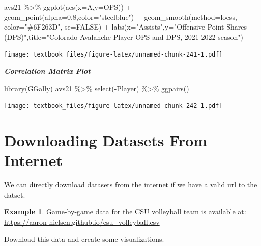 \documentclass[
  11pt,
]{book}
\newenvironment{Shaded}{\begin{snugshade}}{\end{snugshade}}
\newcommand{\AttributeTok}[1]{\textcolor[rgb]{0.77,0.63,0.00}{#1}}
\newcommand{\ConstantTok}[1]{\textcolor[rgb]{0.00,0.00,0.00}{#1}}
\newcommand{\FloatTok}[1]{\textcolor[rgb]{0.00,0.00,0.81}{#1}}
\newcommand{\FunctionTok}[1]{\textcolor[rgb]{0.00,0.00,0.00}{#1}}
\newcommand{\NormalTok}[1]{#1}
\newcommand{\SpecialCharTok}[1]{\textcolor[rgb]{0.00,0.00,0.00}{#1}}
\newcommand{\StringTok}[1]{\textcolor[rgb]{0.31,0.60,0.02}{#1}}
\theoremstyle{definition}
\theoremstyle{definition}
\newtheorem{example}{Example}[chapter]
\theoremstyle{definition}
\theoremstyle{definition}
\theoremstyle{remark}
\begin{document}
\begin{Shaded}
\begin{Highlighting}[]
\NormalTok{avs21 }\SpecialCharTok{\%\textgreater{}\%} \FunctionTok{ggplot}\NormalTok{(}\FunctionTok{aes}\NormalTok{(}\AttributeTok{x=}\NormalTok{A,}\AttributeTok{y=}\NormalTok{OPS)) }\SpecialCharTok{+} \FunctionTok{geom\_point}\NormalTok{(}\AttributeTok{alpha=}\FloatTok{0.8}\NormalTok{,}\AttributeTok{color=}\StringTok{"steelblue"}\NormalTok{) }\SpecialCharTok{+}
  \FunctionTok{geom\_smooth}\NormalTok{(}\AttributeTok{method=}\NormalTok{loess, }\AttributeTok{color=}\StringTok{"\#6F263D"}\NormalTok{, }\AttributeTok{se=}\ConstantTok{FALSE}\NormalTok{) }\SpecialCharTok{+}
  \FunctionTok{labs}\NormalTok{(}\AttributeTok{x=}\StringTok{"Assists"}\NormalTok{,}\AttributeTok{y=}\StringTok{"Offensive Point Shares (DPS)"}\NormalTok{,}\AttributeTok{title=}\StringTok{"Colorado Avalanche Player OPS and DPS, 2021{-}2022 season"}\NormalTok{)}
\end{Highlighting}
\end{Shaded}

\texttt{[image: textbook\_files/figure-latex/unnamed-chunk-241-1.pdf]}

\newpage

\textbf{\emph{Correlation Matrix Plot}}

\begin{Shaded}
\begin{Highlighting}[]
\FunctionTok{library}\NormalTok{(GGally)}
\NormalTok{avs21 }\SpecialCharTok{\%\textgreater{}\%} \FunctionTok{select}\NormalTok{(}\SpecialCharTok{{-}}\NormalTok{Player) }\SpecialCharTok{\%\textgreater{}\%} \FunctionTok{ggpairs}\NormalTok{()}
\end{Highlighting}
\end{Shaded}

\texttt{[image: textbook\_files/figure-latex/unnamed-chunk-242-1.pdf]}

\newpage

\hypertarget{downloading-datasets-from-internet}{%
\section{Downloading Datasets From Internet}\label{downloading-datasets-from-internet}}

We can directly download datasets from the internet if we have a valid url to the datset.

\begin{example}
Game-by-game data for the CSU volleyball team is available at: \url{https://aaron-nielsen.github.io/csu_volleyball.csv}

Download this data and create some visualizations.
\end{example}
\end{document}
